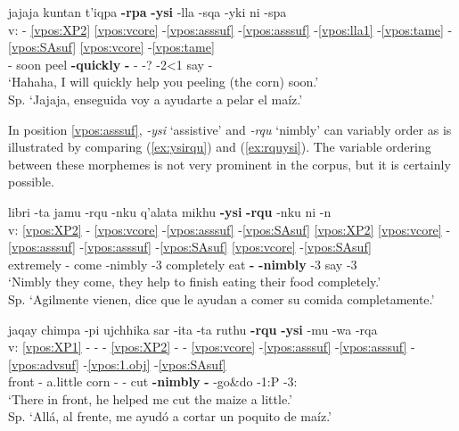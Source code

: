 \documentclass[output=paper]{langscibook}
\begin{document}
\ea \label{ex:rpaysi}{
    \glll {} jajaja kuntan t'iqpa \textbf{-rpa} \textbf{-ysi} -lla -sqa -yki ni -spa \\
    v: - \ref{vpos:XP2} \ref{vpos:vcore} -\ref{vpos:asssuf} -\ref{vpos:asssuf} -\ref{vpos:lla1} -\ref{vpos:tame} -\ref{vpos:SAsuf} \ref{vpos:vcore} -\ref{vpos:tame} \\
    {} - soon peel \textbf{-quickly} \textbf{-\Assist{}} -\Limit{} -? -2\Sg{}<1\Sg{} say -\Gerund{}   \\
    \glt `Hahaha,  I will quickly  help you peeling (the corn) soon.' \\ Sp. `Jajaja, enseguida voy a ayudarte a pelar el maíz.' }
\z 

In position \ref{vpos:asssuf}, \textit{-ysi} `assistive' and \textit{-rqu} `nimbly' can variably order as is illustrated by comparing (\ref{ex:ysirqu}) and (\ref{ex:rquysi}). The variable ordering between these morphemes is not very prominent in the corpus, but it is certainly possible.

\ea \label{ex:ysirqu}{
    \glll {} libri -ta jamu -rqu -nku q'alata mikhu \textbf{-ysi} \textbf{-rqu} -nku ni -n   \\
    v: \ref{vpos:XP2} - \ref{vpos:vcore} -\ref{vpos:asssuf} -\ref{vpos:SAsuf} \ref{vpos:XP2} \ref{vpos:vcore} -\ref{vpos:asssuf} -\ref{vpos:asssuf} -\ref{vpos:SAsuf} \ref{vpos:vcore} -\ref{vpos:SAsuf} \\
    {} extremely -\Acc{} come -nimbly -3\Pl{} completely eat \textbf{-\Assist{}} \textbf{-nimbly} -3\Pl{} say -3\Sg{} \\
    \glt `Nimbly they come, they help to finish eating their food completely.' \\ Sp. `Agilmente vienen, dice que le ayudan a comer su comida completamente.'
    }
\z 

\largerpage
\ea \label{ex:rquysi}{
    \glll {} jaqay chimpa -pi ujchhika sar -ita -ta ruthu \textbf{-rqu} \textbf{-ysi} -mu -wa -rqa \\
    v: \ref{vpos:XP1} - - - \ref{vpos:XP2} - - \ref{vpos:vcore} -\ref{vpos:asssuf} -\ref{vpos:asssuf} -\ref{vpos:advsuf} -\ref{vpos:1.obj} -\ref{vpos:SAsuf} \\
    {} \Dem{} front -\Loc{} a.little corn -\Dim{} -\Acc{} cut \textbf{-nimbly} \textbf{-\Assist{}} -go\&do -1:P -3\Sg{}:\Pst{} \\
    \glt `There in front, he helped me cut the maize a little.' \\ Sp. `Allá, al frente, me ayudó a cortar un poquito de maíz.'
    }
\z
\end{document}
